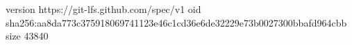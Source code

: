 version https://git-lfs.github.com/spec/v1
oid sha256:aa8da773c375918069741123e46c1cd36e6de32229e73b0027300bbafd964cbb
size 43840
